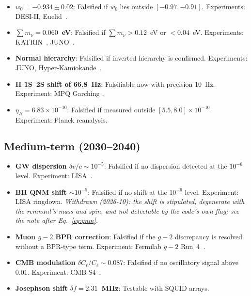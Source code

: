 \documentclass[aps,prd,twocolumn,superscriptaddress,longbibliography,nofootinbib]{revtex4-2}
\begin{document}
\begin{itemize}
\item \textbf{$w_0 = -0.934 \pm 0.02$}: Falsified if $w_0$ lies
  outside $[-0.97, -0.91]$.  Experiments: DESI-II,
  Euclid~\cite{Euclid2024}.

\item \textbf{$\sum m_\nu = 0.060$~eV}: Falsified if $\sum m_\nu
  > 0.12$~eV or $< 0.04$~eV.  Experiments: KATRIN~\cite{KATRIN2022},
  JUNO~\cite{JUNO2022}.

\item \textbf{Normal hierarchy}: Falsified if inverted hierarchy is
  confirmed.  Experiments: JUNO, Hyper-Kamiokande~\cite{HyperK2018}.

\item \textbf{H 1S--2S shift of 66.8~Hz}: Falsifiable now with
  precision 10~Hz.  Experiment: MPQ Garching~\cite{Parthey2011}.

\item \textbf{$\eta_B = 6.83 \times 10^{-10}$}: Falsified if
  measured outside $[5.5, 8.0] \times 10^{-10}$.  Experiment:
  Planck reanalysis.
\end{itemize}

\subsection{Medium-term (2030--2040)}

\begin{itemize}
\item \textbf{GW dispersion $\delta v/c \sim 10^{-5}$}: Falsified
  if no dispersion detected at the $10^{-6}$ level.  Experiment:
  LISA~\cite{LISA2023}.

\item \textbf{BH QNM shift $\sim 10^{-5}$}: Falsified if no
  shift at the $10^{-6}$ level.  Experiment: LISA ringdown.
  \textit{Withdrawn (2026-10): the shift is stipulated, degenerate
  with the remnant's mass and spin, and not detectable by the code's
  own flag; see the note after Eq.~\eqref{eq:qnm}.}

\item \textbf{Muon $g-2$ BPR correction}: Falsified if the $g-2$
  discrepancy is resolved without a BPR-type term.  Experiment:
  Fermilab $g-2$ Run~4~\cite{FermilabG2}.

\item \textbf{CMB modulation $\delta C_\ell/C_\ell \sim 0.087$}:
  Falsified if no oscillatory signal above 0.01.  Experiment:
  CMB-S4~\cite{CMBS4}.

\item \textbf{Josephson shift $\delta f = 2.31$~MHz}: Testable with
  SQUID arrays.
\end{itemize}
\end{document}
